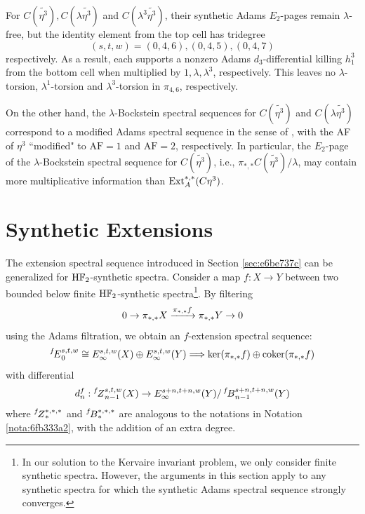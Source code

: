 \documentclass{amsart}
\numberwithin{equation}{section}
\newcommand{\AF}{\mathrm{AF}}
\newcommand{\ESS}[1]{\prescript{#1\!}{}{E}}
\newcommand{\ZESS}[1]{\prescript{#1\!}{}{Z}}
\newcommand{\BESS}[1]{\prescript{#1\!}{}{B}}
\newcommand{\HF}{\mathrm{H}\bF_2}
\begin{document}
\begin{remark}
    For $C(\tilde{\eta^3}), C(\lambda\tilde{\eta^3})$ and $C(\lambda^3\tilde{\eta^3})$, their synthetic Adams $E_2$-pages remain $\lambda$-free, but the identity element from the top cell has tridegree 
    $$(s,t,w) =(0,4,6), (0,4,5), (0,4,7)$$ 
    respectively. As a result, each supports a nonzero Adams $d_3$-differential killing $h_1^3$ from the bottom cell when multiplied by $1, \lambda, \lambda^3$, respectively. This leaves no $\lambda$-torsion, $\lambda^1$-torsion and $\lambda^3$-torsion in $\pi_{4,6}$, respectively.

    On the other hand, the $\lambda$-Bockstein spectral sequences for $C(\tilde{\eta^3})$ and $ C(\lambda\tilde{\eta^3})$ correspond to a modified Adams spectral sequence in the sense of \cite[Section 3]{BHHM}, with the AF of $\eta^3$ ``modified" to $\AF=1$ and $\AF=2$, respectively. In particular, the $E_2$-page of the $\lambda$-Bockstein spectral sequence for $C(\tilde{\eta^3})$, i.e., $\pi_{*,*}C(\tilde{\eta^3})/\lambda$, may contain more multiplicative information than $\mathrm{Ext}_A^{*,*}(C\eta^3)$. 
    
    
    
    
   
\end{remark}

\section{Synthetic Extensions} \label{sec:synext}
The extension spectral sequence introduced in Section \ref{sec:e6be737c} can be generalized for $\HF$-synthetic spectra. Consider a map $f: X\to Y$ between two bounded below finite $\HF$-synthetic spectra\footnote{In our solution to the Kervaire invariant problem, we only consider finite synthetic spectra. However, the arguments in this section apply to any synthetic spectra for which the synthetic Adams spectral sequence strongly converges.}. By filtering
$$0\to \pi_{*,*}X\xrightarrow{\pi_{*,*}f} \pi_{*,*}Y\to 0$$
using the Adams filtration, we obtain an $f$-extension spectral sequence:
$$\ESS{f}_0^{s,t,w} \cong E_\infty^{s,t,w}(X) \oplus E_\infty^{s,t,w}(Y) \Longrightarrow \Ker(\pi_{*,*}f)\oplus \Coker(\pi_{*,*}f)$$
with differential
$$d_n^f: \ZESS{f}_{n-1}^{s,t,w}(X)\to E_\infty^{s+n,t+n,w}(Y)/\BESS{f}_{n-1}^{s+n,t+n,w}(Y)$$
where $\ZESS{f}_*^{*,*,*}$ and $\BESS{f}_*^{*,*,*}$ are  analogous to the notations in Notation \ref{nota:6fb333a2}, with the addition of an extra degree.
\end{document}
